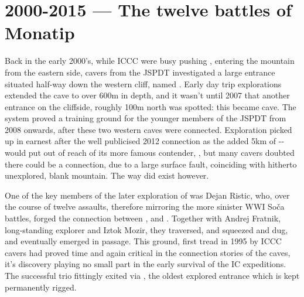 \section{2000-2015 --- The twelve battles of Monatip}
Back in the early 2000’s, while ICCC were busy pushing , entering the mountain from the eastern side, cavers from the JSPDT investigated a large entrance situated half-way down the western cliff, named . Early day trip explorations extended the cave to over 600m in depth, and it wasn’t until 2007 that another entrance  on the cliffside, roughly 100m north was spotted: this became  cave. The system proved a training ground for the younger members of the JSPDT from 2008 onwards, after these two western caves were connected. Exploration picked up in earnest after the well publicised 2012 connection as the added 5km of -- would put  out of reach of its more famous contender, , but many cavers doubted there could be a connection, due to a large surface fault, coinciding with hitherto unexplored, blank mountain. The way did exist however.

One of the key members of the later exploration of  was Dejan Ristic, who, over the course of twelve assaults, therefore mirroring the more sinister WWI Soča battles, forged the connection between , and . Together with Andrej Fratnik, long-standing  explorer and Iztok Mozir, they traversed, and squeezed and dug, and eventually emerged in  passage. This ground, first tread in 1995 by ICCC cavers had proved time and again critical in the connection stories of the caves, it’s discovery playing no small part in the early survival of the IC expeditions. The successful trio fittingly exited via , the oldest explored entrance which is kept permanently rigged.

